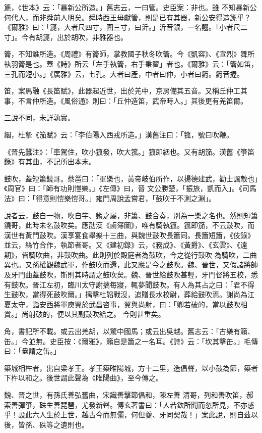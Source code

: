 \begin{pinyinscope}
 篪，《世本》云：「暴新公所造。」舊志云，一曰管。史臣案：非也。雖
 不知暴新公何代人，而非舜前人明矣。舜時西王母獻管，則是已有其器，新公安得造篪乎？《爾雅》曰：「篪，大者尺四寸，圍三寸，曰沂。」沂音銀，一名翹。「小者尺二寸」。今有胡篪，出於胡吹，非雅器也。



 籥，不知誰所造。《周禮》有籥師，掌教國子秋冬吹籥。今《凱容》、《宣烈》舞所執羽籥是也。蓋《詩》所云「左手執籥，右手秉翟」者也。《爾雅》云：「籥如笛，三孔而短小。」《廣雅》云，七孔。大者曰產，中者曰仲，小者曰箹。箹音握。



 笛，案馬融《長笛賦》，此器起近世，出於羌中，京房備其五音。又稱丘仲工其事，不言仲所造。《風俗通》則曰：「丘仲造笛，武帝時人。」其後更有羌笛爾。



 三說不同，未詳孰實。



 絪，杜摯《笳賦》云：「李伯陽入西戎所造。」漢舊注曰：「箛，號曰吹鞭。



 《晉先蠶注》：「車駕住，吹小箛發，吹大箛。」箛即絪也。又有胡笳。漢舊《箏笛錄》有其曲，不記所出本末。



 鼓吹，蓋短簫鐃哥。蔡邕曰：「軍樂也，黃帝岐伯所作，以揚德建武，勸士諷敵也」《周官》曰：「師有功則愷樂。」《左傳》曰，晉
 文公勝楚，「振旅，凱而入」。《司馬法》曰：「得意則愷樂愷哥。」雍門周說孟嘗君，「鼓吹于不測之淵」。



 說者云，鼓自一物，吹自竽、籟之屬，非簫、鼓合奏，別為一樂之名也。然則短簫鐃哥，此時未名鼓吹矣。應劭漢《鹵簿圖》，唯有騎執箛。箛即笳，不云鼓吹，而漢世有黃門鼓吹。漢享宴食舉樂十三曲，與魏世鼓吹長簫同。長簫短簫，《伎錄》並云，絲竹合作，執節者哥。又《建初錄》云，《務成》、《黃爵》、《玄雲》、《遠期》，皆騎吹曲，非鼓吹曲。此則列於殿庭者為鼓吹，今之從行鼓吹
 為騎吹，二曲異也。又孫權觀魏武軍，作鼓吹而還，此又應是今之鼓吹。魏、晉世，又假諸將帥及牙門曲蓋鼓吹，斯則其時謂之鼓吹矣。魏、晉世給鼓吹甚輕，牙門督將五校，悉有鼓吹。晉江左初，臨川太守謝摛每寢，輒夢聞鼓吹。有人為其占之曰：「君不得生鼓吹，當得死鼓吹爾。」摛擊杜韜戰沒，追贈長水校尉，葬給鼓吹焉。謝尚為江夏太守，詣安西將軍庾翼於武昌咨事，翼與尚射，曰：「卿若破的，當以鼓吹相賞。」尚射破的，便以其副鼓吹給之。
 今則甚重矣。



 角，書記所不載。或云出羌胡，以驚中國馬；或云出吳越。舊志云：「古樂有籟、缶。」今並無。史臣按：《爾雅》，籟自是簫之一名耳。《詩》云：「坎其擊缶。」毛傳曰：「盎謂之缶。」



 築城相杵者，出自梁孝王。孝王築睢陽城，方十二里，造倡聲，以小鼓為節，築者下杵以和之。後世謂此聲為《睢陽曲》，至今傳之。



 魏、晉之世，有孫氏善弘舊曲，宋識善擊節倡和，陳左善
 清哥，列和善吹笛，郝索善彈箏，硃生善琵琶，尤發新聲。傅玄著書曰：「人若欽所聞而忽所見，不亦惑乎！設此六人生於上世，越古今而無儷，何但夔、牙同契哉！」案此說，則自茲以後，皆孫、硃等之遺則也。



\end{pinyinscope}